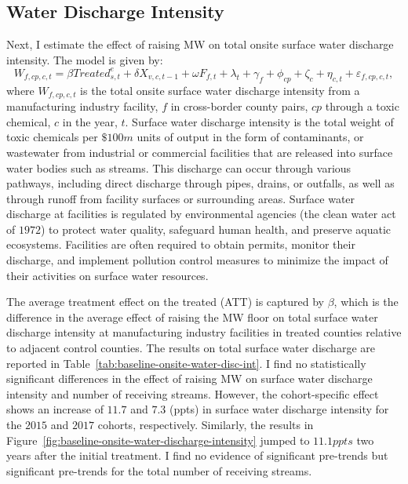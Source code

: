 \documentclass[12pt, english]{article}
\begin{document}
    \subsection{Water Discharge Intensity}\label{subsec:water-discharge-intensity}
    Next, I estimate the effect of raising MW on total onsite surface water discharge intensity. The model is given by:
    \begin{equation}
        W_{f,cp,c,t} = \beta Treated_{s,t}^e + \delta X_{v,c,t-1} + \omega F_{f,t} + \lambda_{t} + \gamma_{f} + \phi_{cp} + \zeta_{c} + \eta_{c,t} + \varepsilon_{f,cp,c,t},\label{eq:baseline-onsite-water-discharge-intensity}
    \end{equation}
    where $W_{f,cp,c,t}$ is the total onsite surface water discharge intensity from a manufacturing industry facility, $f$ in cross-border county pairs, $cp$ through a toxic chemical, $c$ in the year, $t$. Surface water discharge intensity is the total weight of toxic chemicals per $\$100m$ units of output in the form of contaminants, or wastewater from industrial or commercial facilities that are released into surface water bodies such as streams. This discharge can occur through various pathways, including direct discharge through pipes, drains, or outfalls, as well as through runoff from facility surfaces or surrounding areas. Surface water discharge at facilities is regulated by environmental agencies (the clean water act of $1972$) to protect water quality, safeguard human health, and preserve aquatic ecosystems. Facilities are often required to obtain permits, monitor their discharge, and implement pollution control measures to minimize the impact of their activities on surface water resources.
    

    The average treatment effect on the treated (ATT) is captured by $\beta$, which is the difference in the average effect of raising the MW floor on total surface water discharge intensity at manufacturing industry facilities in treated counties relative to adjacent control counties. The results on total surface water discharge are reported in Table~\ref{tab:baseline-onsite-water-disc-int}. I find no statistically significant differences in the effect of raising MW on surface water discharge intensity and number of receiving streams. However, the cohort-specific effect shows an increase of $11.7$ and $7.3$ (ppts) in surface water discharge intensity for the $2015$ and $2017$ cohorts, respectively. Similarly, the results in Figure~\ref{fig:baseline-onsite-water-discharge-intensity} jumped to $11.1ppts$ two years after the initial treatment. I find no evidence of significant pre-trends but significant pre-trends for the total number of receiving streams.
    
\end{document}

